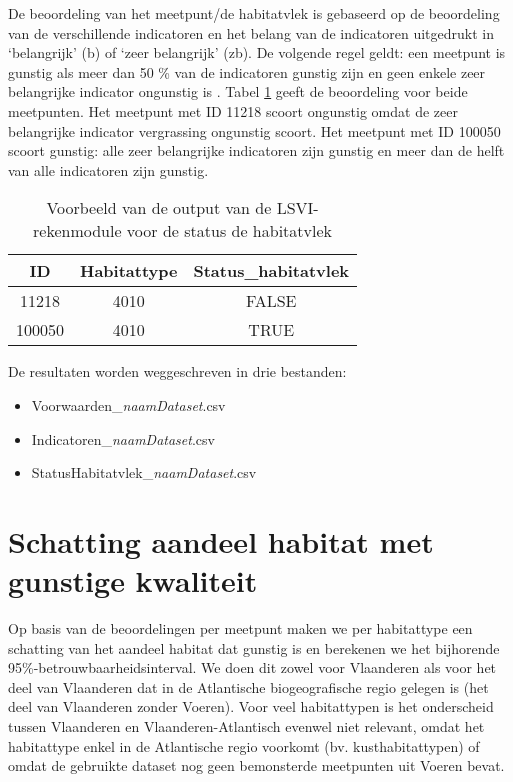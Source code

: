 \documentclass[twoside]{extreport}
\begin{document}
De beoordeling van het meetpunt/de habitatvlek is gebaseerd op de
beoordeling van de verschillende indicatoren en het belang van de
indicatoren uitgedrukt in `belangrijk' (b) of `zeer belangrijk' (zb). De
volgende regel geldt: een meetpunt is gunstig als meer dan 50 \% van de
indicatoren gunstig zijn en geen enkele zeer belangrijke indicator
ongunstig is \citep{Paelinckx2019}. Tabel \ref{tab:tabelStatus} geeft de
beoordeling voor beide meetpunten. Het meetpunt met ID 11218 scoort
ongunstig omdat de zeer belangrijke indicator vergrassing ongunstig
scoort. Het meetpunt met ID 100050 scoort gunstig: alle zeer belangrijke
indicatoren zijn gunstig en meer dan de helft van alle indicatoren zijn
gunstig.

\begin{table}[!h]

\caption{\label{tab:tabelStatus}Voorbeeld van de output van de LSVI-rekenmodule voor de status de habitatvlek}
\centering
\fontsize{9}{11}\selectfont
\begin{tabular}[t]{ccc}
\toprule
ID & Habitattype & Status\_habitatvlek\\
\midrule
11218 & 4010 & FALSE\\
100050 & 4010 & TRUE\\
\bottomrule
\end{tabular}
\end{table}

De resultaten worden weggeschreven in drie bestanden:

\begin{itemize}
\tightlist
\item
  Voorwaarden\_\emph{naamDataset}.csv
\item
  Indicatoren\_\emph{naamDataset}.csv
\item
  StatusHabitatvlek\_\emph{naamDataset}.csv
\end{itemize}

\section{Schatting aandeel habitat met gunstige
kwaliteit}\label{schatting-aandeel-habitat-met-gunstige-kwaliteit}

Op basis van de beoordelingen per meetpunt maken we per habitattype een
schatting van het aandeel habitat dat gunstig is en berekenen we het
bijhorende 95\%-betrouwbaarheidsinterval. We doen dit zowel voor
Vlaanderen als voor het deel van Vlaanderen dat in de Atlantische
biogeografische regio gelegen is (het deel van Vlaanderen zonder
Voeren). Voor veel habitattypen is het onderscheid tussen Vlaanderen en
Vlaanderen-Atlantisch evenwel niet relevant, omdat het habitattype enkel
in de Atlantische regio voorkomt (bv. kusthabitattypen) of omdat de
gebruikte dataset nog geen bemonsterde meetpunten uit Voeren bevat.
\end{document}
